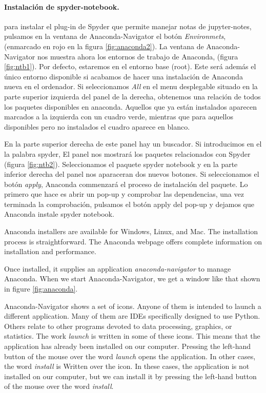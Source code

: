 \begin{paracol}{2}
 \paragraph{Instalación de spyder-notebook.} para instalar el plug-in de Spyder que permite manejar notas de jupyter-notes, pulsamos en la ventana de Anaconda-Navigator el botón \emph{Environmets}, (enmarcado en rojo en la figura \ref{fig:anaconda2}). La ventana de Anaconda-Navigator nos muestra ahora los entornos de trabajo de Anaconda, (figura \ref{fig:ntb1}). Por defecto, estaremos en el entorno base (root). Este será además el único entorno disponible si acabamos de hacer una instalación de Anaconda nueva en el ordenador. Si seleccionamos \emph{All} en el menu desplegable situado en la parte superior izquierda del panel de la derecha,  obtenemos una relación de todos los paquetes disponibles en anaconda. Aquellos que ya están instalados aparecen marcados a la izquierda con un cuadro verde, mientras que para aquellos disponibles pero no instalados el cuadro aparece en blanco.

 En la parte superior derecha de este panel hay un buscador. Si introducimos en el la palabra spyder, El panel nos mostrará los paquetes relacionados con Spyder (figura \ref{fig:ntb2}). Seleccionamos el paquete spyder notebook y en la parte inferior derecha del panel nos aparaceran dos nuevos botones. Si seleccionamos el botón \emph{apply}, Anaconda commenzará el proceso de instalación del paquete. Lo primero que hace es abrir un pop-up y comprobar las dependencias, una vez terminada la comprobación, pulsamos el botón apply del pop-up y dejamos que Anaconda instale spyder notebook.
 

 \switchcolumn
 Anaconda installers are available for Windows, Linux, and Mac. The installation process is straightforward. The Anaconda webpage offers complete information on installation and performance.

 Once installed, it supplies an application \emph{anaconda-navigator} to manage Anaconda. When we start Anaconda-Navigator, we get a window like that shown in figure \ref{fig:anaconda}.

 Anaconda-Navigator shows a set of icons. Anyone of them is intended to launch a different application. Many of them are IDEs specifically designed to use Python. Others relate to other programs devoted to data processing, graphics, or statistics. The work \emph{launch} is written in some of these icons. This means that the application has already been installed on our computer. Pressing the left-hand button of the mouse over the word \emph{launch} opens the application. In other cases, the word \emph{install} is Written over the icon. In these cases, the application is not installed on our computer, but we can install it by pressing the left-hand button of the mouse over the word \emph{install}.


\end{paracol}
